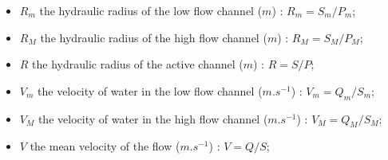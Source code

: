 \begin{itemize}
 \item $R_m$ the hydraulic radius of the low flow channel ($m$) : $R_m = S_m / P_m$;
 \item $R_M$ the hydraulic radius of the high flow channel ($m$) : $R_M = S_M / P_M$;
 \item $R$ the hydraulic radius of the active channel ($m$) : $R = S / P$; \newline

 \item $V_m$ the velocity of water in the low flow channel ($m.s^{-1}$) : $V_m = Q_m / S_m$;
 \item $V_M$ the velocity of water in the high flow channel ($m.s^{-1}$) : $V_M = Q_M / S_M$;
 \item $V$ the mean velocity of the flow ($m.s^{-1}$) : $V = Q / S$;
\end{itemize}
